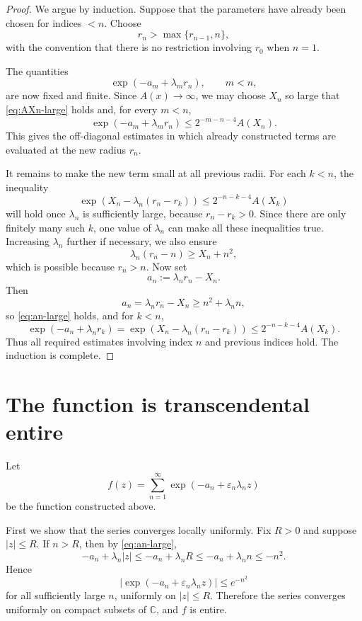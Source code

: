 \documentclass[11pt]{article}
\newcommand{\C}{\mathbb C}
\begin{document}
\begin{proof}
We argue by induction.  Suppose that the parameters have already been chosen
for indices \(<n\).  Choose
\[
r_n>\max\{r_{n-1},n\},
\]
with the convention that there is no restriction involving \(r_0\) when
\(n=1\).

The quantities
\[
\exp(-a_m+\lambda_m r_n),\qquad m<n,
\]
are now fixed and finite.  Since \(A(x)\to\infty\), we may choose \(X_n\) so
large that \eqref{eq:AXn-large} holds and, for every \(m<n\),
\[
\exp(-a_m+\lambda_m r_n)
\le
2^{-m-n-4}A(X_n).
\]
This gives the off-diagonal estimates in which already constructed terms are
evaluated at the new radius \(r_n\).

It remains to make the new term small at all previous radii.  For each
\(k<n\), the inequality
\[
\exp(X_n-\lambda_n(r_n-r_k))
\le
2^{-n-k-4}A(X_k)
\]
will hold once \(\lambda_n\) is sufficiently large, because \(r_n-r_k>0\).
Since there are only finitely many such \(k\), one value of \(\lambda_n\) can
make all these inequalities true.  Increasing \(\lambda_n\) further if
necessary, we also ensure
\[
\lambda_n(r_n-n)\ge X_n+n^2,
\]
which is possible because \(r_n>n\).  Now set
\[
a_n:=\lambda_n r_n-X_n.
\]
Then
\[
a_n=\lambda_n r_n-X_n\ge n^2+\lambda_n n,
\]
so \eqref{eq:an-large} holds, and for \(k<n\),
\[
\exp(-a_n+\lambda_n r_k)
=
\exp(X_n-\lambda_n(r_n-r_k))
\le
2^{-n-k-4}A(X_k).
\]
Thus all required estimates involving index \(n\) and previous indices hold.
The induction is complete.
\end{proof}

\section{The function is transcendental entire}

Let
\[
 f(z)=\sum_{n=1}^{\infty}
 \exp(-a_n+\varepsilon_n\lambda_n z)
\]
be the function constructed above.

First we show that the series converges locally uniformly.  Fix \(R>0\) and
suppose \(|z|\le R\).  If \(n>R\), then by \eqref{eq:an-large},
\[
-a_n+\lambda_n |z|
\le
-a_n+\lambda_n R
\le
-a_n+\lambda_n n
\le
-n^2.
\]
Hence
\[
\left|\exp(-a_n+\varepsilon_n\lambda_n z)\right|
\le e^{-n^2}
\]
for all sufficiently large \(n\), uniformly on \(|z|\le R\).  Therefore the
series converges uniformly on compact subsets of \(\C\), and \(f\) is entire.
\end{document}
